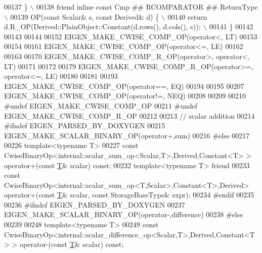 \begin{DoxyCode}
00137 \textcolor{preprocessor}{\} \(\backslash\)}
00138 \textcolor{preprocessor}{friend inline const Cmp ## RCOMPARATOR ## ReturnType \(\backslash\)}
00139 \textcolor{preprocessor}{OP(const Scalar& s, const Derived& d) \{ \(\backslash\)}
00140 \textcolor{preprocessor}{  return d.R\_OP(Derived::PlainObject::Constant(d.rows(), d.cols(), s)); \(\backslash\)}
00141 \textcolor{preprocessor}{\}}
00142 
00143 
00144 
00152 EIGEN\_MAKE\_CWISE\_COMP\_OP(\textcolor{keyword}{operator}<, LT)
00153 
00154 
00161 EIGEN\_MAKE\_CWISE\_COMP\_OP(\textcolor{keyword}{operator}<=, LE)
00162 
00163 
00170 EIGEN\_MAKE\_CWISE\_COMP\_R\_OP(\textcolor{keyword}{operator}>, \textcolor{keyword}{operator}<, LT)
00171 
00172 
00179 EIGEN\_MAKE\_CWISE\_COMP\_R\_OP(\textcolor{keyword}{operator}>=, \textcolor{keyword}{operator}<=, LE)
00180 
00181 
00193 EIGEN\_MAKE\_CWISE\_COMP\_OP(\textcolor{keyword}{operator}==, EQ)
00194 
00195 
00207 EIGEN\_MAKE\_CWISE\_COMP\_OP(\textcolor{keyword}{operator}!=, NEQ)
00208 
00209 
00210 \textcolor{preprocessor}{#undef EIGEN\_MAKE\_CWISE\_COMP\_OP}
00211 \textcolor{preprocessor}{#undef EIGEN\_MAKE\_CWISE\_COMP\_R\_OP}
00212 
00213 \textcolor{comment}{// scalar addition}
00214 \textcolor{preprocessor}{#ifndef EIGEN\_PARSED\_BY\_DOXYGEN}
00215 EIGEN\_MAKE\_SCALAR\_BINARY\_OP(\textcolor{keyword}{operator}+,sum)
00216 \textcolor{preprocessor}{#else}
00217 
00226 \textcolor{keyword}{template}<\textcolor{keyword}{typename} T>
00227 \textcolor{keyword}{const} CwiseBinaryOp<internal::scalar\_sum\_op<Scalar,T>,Derived,Constant<T> > operator+(\textcolor{keyword}{const} 
      \hyperlink{group___sparse_core___module_class_eigen_1_1_triplet}{T}& scalar) \textcolor{keyword}{const};
00232 \textcolor{keyword}{template}<\textcolor{keyword}{typename} T> \textcolor{keyword}{friend}
00233 \textcolor{keyword}{const} CwiseBinaryOp<internal::scalar\_sum\_op<T,Scalar>,Constant<T>,Derived> operator+(\textcolor{keyword}{const} 
      \hyperlink{group___sparse_core___module_class_eigen_1_1_triplet}{T}& scalar, \textcolor{keyword}{const} StorageBaseType& expr);
00234 \textcolor{preprocessor}{#endif}
00235 
00236 \textcolor{preprocessor}{#ifndef EIGEN\_PARSED\_BY\_DOXYGEN}
00237 EIGEN\_MAKE\_SCALAR\_BINARY\_OP(\textcolor{keyword}{operator}-,difference)
00238 \textcolor{preprocessor}{#else}
00239 
00248 \textcolor{keyword}{template}<\textcolor{keyword}{typename} T>
00249 \textcolor{keyword}{const} CwiseBinaryOp<internal::scalar\_difference\_op<Scalar,T>,Derived,Constant<T> > operator-(\textcolor{keyword}{const} 
      \hyperlink{group___sparse_core___module_class_eigen_1_1_triplet}{T}& scalar) \textcolor{keyword}{const};

\end{DoxyCode}
